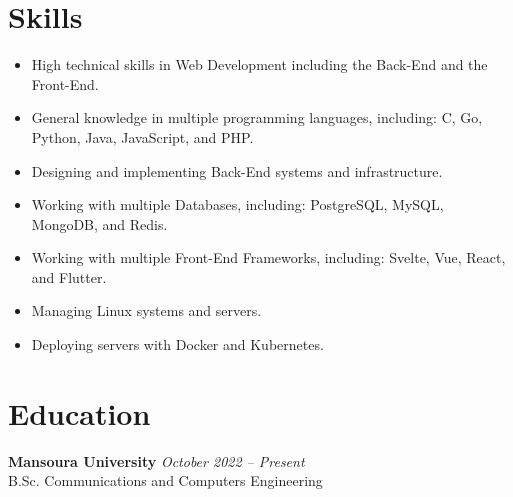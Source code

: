 \documentclass[a4paper]{article}
\newcommand{\hr}{\vspace{10pt}\noindent\hrulefill}
\newcommand{\headerdate}[2]{\textbf{#1} \hfill \textit{\footnotesize{#2}}}
\begin{document}
\section*{Skills}
\begin{itemize}
	\item High technical skills in Web Development including the Back-End and the Front-End.
	\item General knowledge in multiple programming languages, including: C, Go, Python, Java, JavaScript, and PHP.
	\item Designing and implementing Back-End systems and infrastructure.
	\item Working with multiple Databases, including: PostgreSQL, MySQL, MongoDB, and Redis.
	\item Working with multiple Front-End Frameworks, including: Svelte, Vue, React, and Flutter.
	\item Managing Linux systems and servers.
	\item Deploying servers with Docker and Kubernetes.
\end{itemize}

\hr

\section*{Education}

\headerdate{Mansoura University}{October 2022 -- Present}\\
\indent B.Sc. Communications and Computers Engineering
\end{document}
